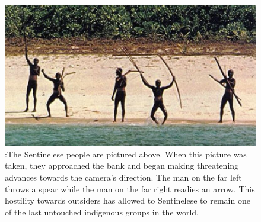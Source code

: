 \documentclass{book}\usepackage{knitr}
\begin{document}
{\begin{figure}
\includegraphics[width=\linewidth]{images/sentpeeps}
\caption{:The Sentinelese people are pictured above. When this picture was taken, they approached the bank and began making threatening advances towards the camera’s direction. The man on the far left throws a spear while the man on the far right readies an arrow. This hostility towards outsiders has allowed to Sentinelese to remain one of the last untouched indigenous groups in the world.}
\label{fig:An Interaction with The Sentinelese People }
\end{figure}

}
\end{document}
